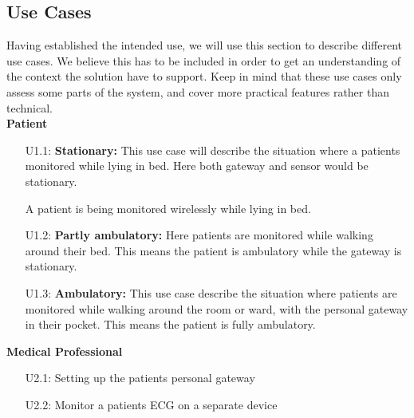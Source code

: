 
\subsection{Use Cases} %
\label{ssub:use_cases}


Having established the intended use, we will use this section to describe different use cases. We believe this has to be included in order to get an understanding of the context the solution have to support. Keep in mind that these use cases only assess some parts of the system, and cover more practical features rather than technical.
\\
\newline
\noindent
\textbf{Patient}
\begin{enumerate}

  \item[\textsc{U1.1}:]\textbf{Stationary:} This use case will describe the situation where a patients monitored while lying in bed. Here both gateway and sensor would be stationary.
  
  A patient is being monitored wirelessly while lying in bed.
  

  \item[\textsc{U1.2}:]\textbf{Partly ambulatory:} Here patients are monitored while walking around their bed. This means the patient is ambulatory while the gateway is stationary.

  \item[\textsc{U1.3}:]\textbf{Ambulatory:} This use case describe the situation where patients are monitored while walking around the room or ward, with the personal gateway in their pocket. This means the patient is fully ambulatory.

\end{enumerate}

\noindent
\textbf{Medical Professional}
\begin{enumerate}

  \item[\textsc{U2.1}:] Setting up the patients personal gateway
  \item[\textsc{U2.2}:] Monitor a patients ECG on a separate device

\end{enumerate}


\newline

